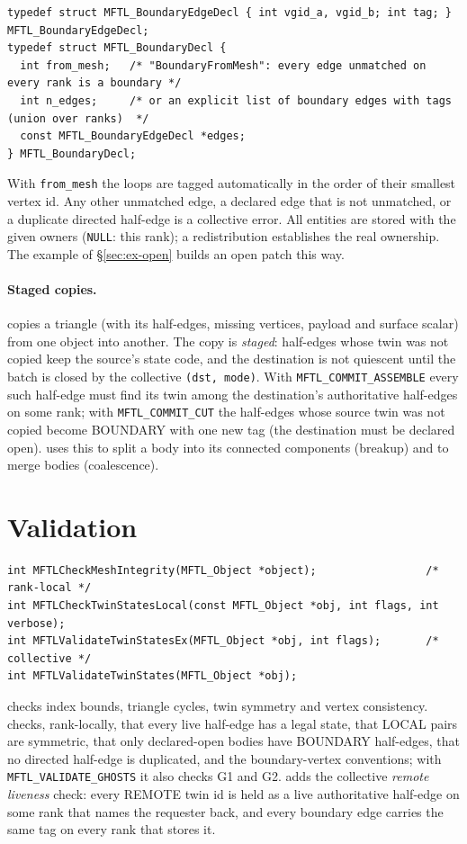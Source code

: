\begin{lstlisting}[numbers=none]
typedef struct MFTL_BoundaryEdgeDecl { int vgid_a, vgid_b; int tag; } MFTL_BoundaryEdgeDecl;
typedef struct MFTL_BoundaryDecl {
  int from_mesh;   /* "BoundaryFromMesh": every edge unmatched on every rank is a boundary */
  int n_edges;     /* or an explicit list of boundary edges with tags (union over ranks)  */
  const MFTL_BoundaryEdgeDecl *edges;
} MFTL_BoundaryDecl;
\end{lstlisting}
With \texttt{from\_mesh} the loops are tagged automatically in the order of their smallest vertex
id. Any other unmatched edge, a declared edge that is not unmatched, or a duplicate directed
half-edge is a collective error. All entities are stored with the given owners (\texttt{NULL}:
this rank); a redistribution establishes the real ownership. The example of
\S\ref{sec:ex-open} builds an open patch this way.

\paragraph{Staged copies.}  copies a triangle (with its
half-edges, missing vertices, payload and surface scalar) from one object into another. The copy
is \emph{staged}: half-edges whose twin was not copied keep the source's state code, and the
destination is not quiescent until the batch is closed by the collective
\texttt{(dst, mode)}. With \texttt{MFTL\_COMMIT\_ASSEMBLE} every such
half-edge must find its twin among the destination's authoritative half-edges on some rank;
with \texttt{MFTL\_COMMIT\_CUT} the half-edges whose source twin was not copied become BOUNDARY
with one new tag (the destination must be declared open). \multi{} uses this to split a body
into its connected components (breakup) and to merge bodies (coalescence).

\section{Validation}
\label{sec:validation}

\begin{lstlisting}[numbers=none]
int MFTLCheckMeshIntegrity(MFTL_Object *object);                 /* rank-local */
int MFTLCheckTwinStatesLocal(const MFTL_Object *obj, int flags, int verbose);
int MFTLValidateTwinStatesEx(MFTL_Object *obj, int flags);       /* collective */
int MFTLValidateTwinStates(MFTL_Object *obj);
\end{lstlisting}
 checks index bounds, triangle cycles, twin symmetry and vertex
consistency.  checks, rank-locally, that every live half-edge has a
legal state, that LOCAL pairs are symmetric, that only declared-open bodies have BOUNDARY
half-edges, that no directed half-edge is duplicated, and the boundary-vertex conventions; with
\texttt{MFTL\_VALIDATE\_GHOSTS} it also checks G1 and G2.  adds the
collective \emph{remote liveness} check: every REMOTE twin id is held as a live authoritative
half-edge on some rank that names the requester back, and every boundary edge carries the same
tag on every rank that stores it.

